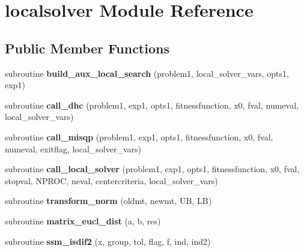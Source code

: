 \hypertarget{classlocalsolver}{\section{localsolver Module Reference}
\label{classlocalsolver}
}
\subsection*{Public Member Functions}
\begin{DoxyCompactItemize}
\item 
\hypertarget{classlocalsolver_a4a9999374cb0f75e3117cf3ba77c554e}{subroutine {\bfseries build\-\_\-aux\-\_\-local\-\_\-search} (problem1, local\-\_\-solver\-\_\-vars, opts1, exp1)}\label{classlocalsolver_a4a9999374cb0f75e3117cf3ba77c554e}

\item 
\hypertarget{classlocalsolver_a1fd93ffd0b708e4e0b863614fd291f14}{subroutine {\bfseries call\-\_\-dhc} (problem1, exp1, opts1, fitnessfunction, x0, fval, numeval, local\-\_\-solver\-\_\-vars)}\label{classlocalsolver_a1fd93ffd0b708e4e0b863614fd291f14}

\item 
\hypertarget{classlocalsolver_a1f3af14d4238cf17f28c7b76b20f119b}{subroutine {\bfseries call\-\_\-misqp} (problem1, exp1, opts1, fitnessfunction, x0, fval, numeval, exitflag, local\-\_\-solver\-\_\-vars)}\label{classlocalsolver_a1f3af14d4238cf17f28c7b76b20f119b}

\item 
\hypertarget{classlocalsolver_a1a45c3f1242dc201f6ea9ae4a6a7d8b0}{subroutine {\bfseries call\-\_\-local\-\_\-solver} (problem1, exp1, opts1, fitnessfunction, x0, fval, stopval, N\-P\-R\-O\-C, neval, centercriteria, local\-\_\-solver\-\_\-vars)}\label{classlocalsolver_a1a45c3f1242dc201f6ea9ae4a6a7d8b0}

\item 
\hypertarget{classlocalsolver_a53822899bfe532f92590ba6b475da80e}{subroutine {\bfseries transform\-\_\-norm} (oldmt, newmt, U\-B, L\-B)}\label{classlocalsolver_a53822899bfe532f92590ba6b475da80e}

\item 
\hypertarget{classlocalsolver_a4a58997447f0924d01074238319eb3c7}{subroutine {\bfseries matrix\-\_\-eucl\-\_\-dist} (a, b, res)}\label{classlocalsolver_a4a58997447f0924d01074238319eb3c7}

\item 
\hypertarget{classlocalsolver_ada1d2da69e7adc121daaf84bca7a83c2}{subroutine {\bfseries ssm\-\_\-isdif2} (x, group, tol, flag, f, ind, ind2)}\label{classlocalsolver_ada1d2da69e7adc121daaf84bca7a83c2}


\end{DoxyCompactItemize}
